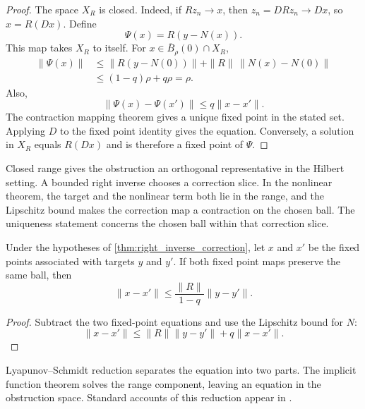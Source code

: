 \begin{proof}
The space $X_R$ is closed.  Indeed, if $Rz_n\to x$, then $z_n=DRz_n\to Dx$, so $x=R(Dx)$.  Define
\[
\Psi(x)=R(y-N(x)).
\]
This map takes $X_R$ to itself.  For $x\in\overline B_\rho(0)\cap X_R$,
\[
\begin{aligned}
\|\Psi(x)\|
&\le
\|R(y-N(0))\|
+
\|R\|\,\|N(x)-N(0)\|\\
&\le
(1-q)\rho+q\rho
=\rho.
\end{aligned}
\]
Also,
\[
\|\Psi(x)-\Psi(x')\|
\le q\|x-x'\|.
\]
The contraction mapping theorem gives a unique fixed point in the stated set.  Applying $D$ to the fixed point identity gives the equation.  Conversely, a solution in $X_R$ equals $R(Dx)$ and is therefore a fixed point of $\Psi$.
\end{proof}

\begin{keyidea}[title={The hypotheses behind correction}]
Closed range gives the obstruction an orthogonal representative in the Hilbert setting. A bounded right inverse chooses a correction slice. In the nonlinear theorem, the target and the nonlinear term both lie in the range, and the Lipschitz bound makes the correction map a contraction on the chosen ball. The uniqueness statement concerns the chosen ball within that correction slice.
\end{keyidea}

\begin{corollary}\label{cor:correction_stability}
Under the hypotheses of \cref{thm:right_inverse_correction}, let $x$ and $x'$ be the fixed points associated with targets $y$ and $y'$.  If both fixed point maps preserve the same ball, then
\[
\|x-x'\|
\le
\frac{\|R\|}{1-q}\|y-y'\|.
\]
\end{corollary}

\begin{proof}
Subtract the two fixed-point equations and use the Lipschitz bound for $N$:
\[
\|x-x'\|
\le
\|R\|\|y-y'\|+q\|x-x'\|.
\]
\end{proof}

Lyapunov--Schmidt reduction separates the equation into two parts. The implicit function theorem solves the range component, leaving an equation in the obstruction space. Standard accounts of this reduction appear in \cite{Kielhoefer2012,Zeidler1986}.

